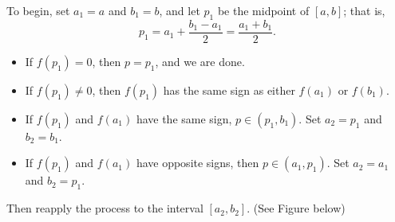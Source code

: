  To begin, set $a_1 = a$ and $b_1 = b$, and let $p_1$ be the midpoint of $[a,b]$; that is,
\[p_1=a_1+\frac{b_1-a_1}{2}=\frac{a_1+b_1}{2}.\]
\begin{itemize}
\item If $f(p_1)=0$, then $p=p_1$, and we are done.
\item If $f(p_1)\neq0$, then $f(p_1)$ has the same sign as either $f(a_1)$ or $f(b_1)$.
\item If $f\left(p_{1}\right)$ and $f\left(a_{1}\right)$ have the same sign, $p\in(p_1,b_1)$. Set $a_{2}=p_{1}$ and $b_{2}=b_{1}$.
\item If $f\left(p_{1}\right)$ and $f\left(a_{1}\right)$ have opposite signs, then $p\in(a_1,p_1)$. Set $a_{2}=a_{1}$ and $b_{2}=p_{1}$.
\end{itemize}

Then reapply the process to the interval $\left[a_{2}, b_{2}\right]$. (See Figure below)

